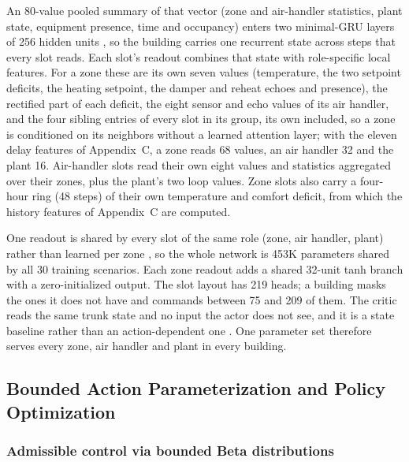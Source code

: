 \documentclass{article}
\begin{document}
An 80-value pooled summary of that vector (zone and air-handler statistics, plant state, equipment presence, time and occupancy) enters two minimal-GRU layers of 256 hidden units \citep{feng2024rnn}, so the building carries one recurrent state across steps that every slot reads. Each slot's readout combines that state with role-specific local features. For a zone these are its own seven values (temperature, the two setpoint deficits, the heating setpoint, the damper and reheat echoes and presence), the rectified part of each deficit, the eight sensor and echo values of its air handler, and the four sibling entries of every slot in its group, its own included, so a zone is conditioned on its neighbors without a learned attention layer; with the eleven delay features of Appendix~C, a zone reads 68 values, an air handler 32 and the plant 16. Air-handler slots read their own eight values and statistics aggregated over their zones, plus the plant's two loop values. Zone slots also carry a four-hour ring (48 steps) of their own temperature and comfort deficit, from which the history features of Appendix~C are computed.

One readout is shared by every slot of the same role (zone, air handler, plant) rather than learned per zone \citep{zaheer2017deepsets}, so the whole network is 453K parameters shared by all 30 training scenarios. Each zone readout adds a shared 32-unit tanh branch with a zero-initialized output. The slot layout has 219 heads; a building masks the ones it does not have and commands between 75 and 209 of them. The critic reads the same trunk state and no input the actor does not see, and it is a state baseline rather than an action-dependent one \citep{tucker2018mirage}. One parameter set therefore serves every zone, air handler and plant in every building.

\subsection{Bounded Action Parameterization and Policy Optimization}

\subsubsection{Admissible control via bounded Beta distributions}
\label{sec:beta_head}
\end{document}
